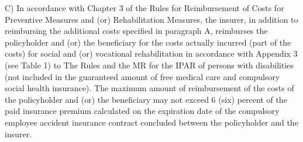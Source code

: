 \begin{multicols}{2}
C) In accordance with Chapter 3 of the Rules for Reimbursement of Costs
for Preventive Measures and (or) Rehabilitation Measures, the insurer,
in addition to reimbursing the additional costs specified in paragraph
A, reimburses the policyholder and (or) the beneficiary for the costs
actually incurred (part of the costs) for social and (or) vocational
rehabilitation in accordance with Appendix 3 (see Table 1) to The Rules
and the MR for the IPAR of persons with disabilities (not included in
the guaranteed amount of free medical care and compulsory social health
insurance). The maximum amount of reimbursement of the costs of the
policyholder and (or) the beneficiary may not exceed 6 (six) percent of
the paid insurance premium calculated on the expiration date of the
compulsory employee accident insurance contract concluded between the
policyholder and the insurer.
\end{multicols}


